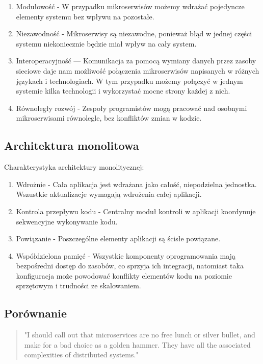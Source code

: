 \documentclass[runningheads,12pt]{llncs}
\begin{document}
\begin{enumerate}
    \item Modułowość - W przypadku mikroserwisów możemy wdrażać pojedyncze elementy systemu bez wpływu na pozostałe.
    \item Niezawodność - Mikroserwisy są niezawodne, ponieważ błąd w jednej części systemu niekoniecznie będzie miał wpływ na cały system.
    \item Interoperacyjność — Komunikacja za pomocą wymiany danych przez zasoby sieciowe daje nam możliwość połączenia mikroserwisów napisanych w różnych językach i technologiach. W tym przypadku możemy połączyć w jednym systemie kilka technologii i wykorzystać mocne strony każdej z nich.
    \item Równoległy rozwój - Zespoły programistów mogą pracować nad osobnymi mikroserwisami równolegle, bez konfliktów zmian w kodzie.
\end{enumerate}

\subsection{Architektura monolitowa}

Charakterystyka architektury monolitycznej:

\begin{enumerate}
    \item Wdrożnie - Cała aplikacja jest wdrażana jako całość, niepodzielna jednostka. Wszustkie aktualizacje wymagają wdrożenia całej aplikacji.
    \item Kontrola przepływu kodu - Centralny moduł kontroli w aplikacji koordynuje sekwencyjne wykonywanie kodu.
    \item Powiązanie - Poszczególne elementy aplikacji są ścisłe powiązane.
    \item Współdzielona pamięć - Wszystkie komponenty oprogramowania mają bezpośredni dostęp do zasobów, co sprzyja ich integracji, natomiast taka konfiguracja może powodować konflikty elementów kodu na poziomie sprzętowym i trudności ze skalowaniem. \cite{sharma2023monolithic}
\end{enumerate}

\subsection{Porównanie}

\begin{quote}
    "I should call out that microservices are no free lunch or silver bullet, and make for a bad choice as a golden hammer. They have all the associated complexities of distributed systems."~\cite[p. 11]{newman2015building}
\end{quote}
\end{document}
